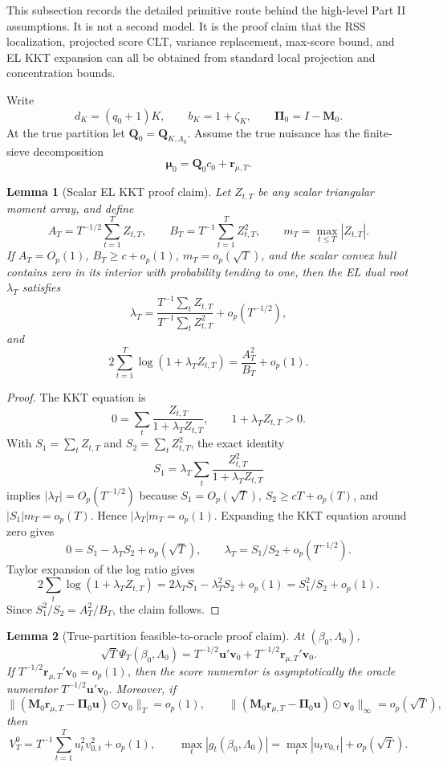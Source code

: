 \documentclass[12pt]{article}
\numberwithin{equation}{section}
\newtheorem{lemma}{Lemma}
\theoremstyle{definition}
\newcommand{\op}{o_p}
\newcommand{\Op}{O_p}
\begin{document}
This subsection records the detailed primitive route behind the high-level
Part II assumptions. It is not a second model. It is the proof claim that the
RSS localization, projected score CLT, variance replacement, max-score bound,
and EL KKT expansion can all be obtained from standard local projection and
concentration bounds.

Write
\[
    d_K=(q_0+1)K,\qquad b_K=1+\zeta_K,
    \qquad \bm\Pi_0=I-\bm M_0.
\]
At the true partition let \(\bm Q_0=\bm Q_{K,\Lambda_0}\). Assume the true
nuisance has the finite-sieve decomposition
\[
    \bm\mu_0=\bm Q_0c_0+\bm r_{\mu,T}.
\]

\begin{lemma}[Scalar EL KKT proof claim]
\label{lem:part2-scalar-el-proof-claim}
Let \(Z_{t,T}\) be any scalar triangular moment array, and define
\[
    A_T=T^{-1/2}\sum_{t=1}^T Z_{t,T},\qquad
    B_T=T^{-1}\sum_{t=1}^T Z_{t,T}^2,\qquad
    m_T=\max_{t\le T}|Z_{t,T}|.
\]
If \(A_T=\Op(1)\), \(B_T\ge c+\op(1)\), \(m_T=\op(\sqrt T)\), and the scalar
convex hull contains zero in its interior with probability tending to one, then
the EL dual root \(\lambda_T\) satisfies
\[
    \lambda_T=\frac{T^{-1}\sum_t Z_{t,T}}{T^{-1}\sum_t Z_{t,T}^2}
    +\op(T^{-1/2}),
\]
and
\[
    2\sum_{t=1}^T\log(1+\lambda_TZ_{t,T})
    =\frac{A_T^2}{B_T}+\op(1).
\]
\end{lemma}

\begin{proof}
The KKT equation is
\[
    0=\sum_t\frac{Z_{t,T}}{1+\lambda_TZ_{t,T}},
    \qquad 1+\lambda_TZ_{t,T}>0.
\]
With \(S_1=\sum_tZ_{t,T}\) and \(S_2=\sum_tZ_{t,T}^2\), the exact identity
\[
    S_1=\lambda_T\sum_t\frac{Z_{t,T}^2}{1+\lambda_TZ_{t,T}}
\]
implies \(|\lambda_T|=\Op(T^{-1/2})\) because
\(S_1=\Op(\sqrt T)\), \(S_2\ge cT+\op(T)\), and
\(|S_1|m_T=\op(T)\). Hence \(|\lambda_T|m_T=\op(1)\). Expanding the KKT
equation around zero gives
\[
    0=S_1-\lambda_TS_2+\op(\sqrt T),
    \qquad
    \lambda_T=S_1/S_2+\op(T^{-1/2}).
\]
Taylor expansion of the log ratio gives
\[
    2\sum_t\log(1+\lambda_TZ_{t,T})
    =2\lambda_TS_1-\lambda_T^2S_2+\op(1)
    =S_1^2/S_2+\op(1).
\]
Since \(S_1^2/S_2=A_T^2/B_T\), the claim follows.
\end{proof}

\begin{lemma}[True-partition feasible-to-oracle proof claim]
\label{lem:part2-feasible-oracle-proof-claim}
At \((\beta_0,\Lambda_0)\),
\[
    \sqrt T\Psi_T(\beta_0,\Lambda_0)
    =T^{-1/2}\bm u'\bm v_0
     +T^{-1/2}\bm r_{\mu,T}'\bm v_0.
\]
If \(T^{-1/2}\bm r_{\mu,T}'\bm v_0=\op(1)\), then the score numerator is
asymptotically the oracle numerator \(T^{-1/2}\bm u'\bm v_0\). Moreover, if
\[
    \|(\bm M_0\bm r_{\mu,T}-\bm\Pi_0\bm u)\odot\bm v_0\|_T=\op(1),
    \qquad
    \|(\bm M_0\bm r_{\mu,T}-\bm\Pi_0\bm u)\odot\bm v_0\|_\infty=\op(\sqrt T),
\]
then
\[
    V_T^0=T^{-1}\sum_{t=1}^T u_t^2v_{0,t}^2+\op(1),
    \qquad
    \max_t|g_t(\beta_0,\Lambda_0)|
    =\max_t|u_tv_{0,t}|+\op(\sqrt T).
\]
\end{lemma}
\end{document}
